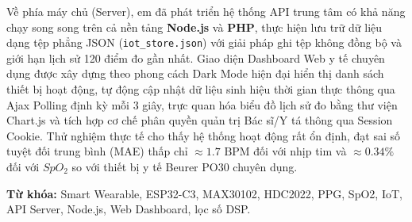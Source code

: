 Về phía máy chủ (Server), em đã phát triển hệ thống API trung tâm có khả năng chạy song song trên cả nền tảng \textbf{Node.js} và \textbf{PHP}, thực hiện lưu trữ dữ liệu dạng tệp phẳng JSON (\texttt{iot\_store.json}) với giải pháp ghi tệp không đồng bộ và giới hạn lịch sử 120 điểm đo gần nhất. Giao diện Dashboard Web y tế chuyên dụng được xây dựng theo phong cách Dark Mode hiện đại hiển thị danh sách thiết bị hoạt động, tự động cập nhật dữ liệu sinh hiệu thời gian thực thông qua Ajax Polling định kỳ mỗi 3 giây, trực quan hóa biểu đồ lịch sử đo bằng thư viện Chart.js và tích hợp cơ chế phân quyền quản trị Bác sĩ/Y tá thông qua Session Cookie. Thử nghiệm thực tế cho thấy hệ thống hoạt động rất ổn định, đạt sai số tuyệt đối trung bình (MAE) thấp chỉ $\approx 1.7\text{ BPM}$ đối với nhịp tim và $\approx 0.34\%$ đối với $SpO_2$ so với thiết bị y tế Beurer PO30 chuyên dụng.

\vspace{6pt}
\noindent\textbf{Từ khóa:} Smart Wearable, ESP32-C3, MAX30102, HDC2022, PPG, SpO2, IoT, API Server, Node.js, Web Dashboard, lọc số DSP.
\cleardoublepage
